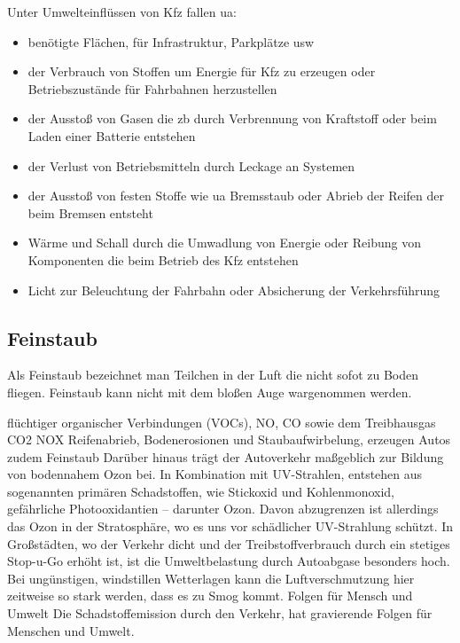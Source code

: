 Unter Umwelteinflüssen von \ac{Kfz} fallen \ac{ua}:
\begin{itemize}
	\item benötigte Flächen, für Infrastruktur, Parkplätze \ac{usw}
	\item der Verbrauch von Stoffen um Energie für \ac{Kfz} zu erzeugen oder Betriebszustände für Fahrbahnen herzustellen
	\item der Ausstoß von Gasen die \ac{zb} durch Verbrennung von Kraftstoff oder beim Laden einer Batterie entstehen
	\item der Verlust von Betriebsmitteln durch Leckage an Systemen
	\item der Ausstoß von festen Stoffe wie \ac{ua} Bremsstaub oder Abrieb der Reifen der beim Bremsen entsteht
	\item Wärme und Schall durch die Umwadlung von Energie oder Reibung von Komponenten die beim Betrieb des \ac{Kfz} entstehen
	\item Licht zur Beleuchtung der Fahrbahn oder Absicherung der Verkehrsführung
\end{itemize}


\subsection{Feinstaub}

Als Feinstaub bezeichnet man Teilchen in der Luft die nicht sofot zu Boden fliegen.
\newline
Feinstaub kann nicht mit dem bloßen Auge wargenommen werden.

flüchtiger organischer Verbindungen (VOCs), \ac{NO}, \ac{CO} sowie dem Treibhausgas \ac{CO2} \ac{NOX}
Reifenabrieb, Bodenerosionen und Staubaufwirbelung, erzeugen Autos zudem Feinstaub
Darüber hinaus trägt der Autoverkehr maßgeblich zur Bildung von bodennahem Ozon bei. In Kombination mit UV-Strahlen, entstehen aus sogenannten primären Schadstoffen, wie Stickoxid und Kohlenmonoxid, gefährliche Photooxidantien – darunter Ozon. Davon abzugrenzen ist allerdings das Ozon in der Stratosphäre, wo es uns vor schädlicher UV-Strahlung schützt.
In Großstädten, wo der Verkehr dicht und der Treibstoffverbrauch durch ein stetiges Stop-u-Go erhöht ist, ist die Umweltbelastung durch Autoabgase besonders hoch. Bei ungünstigen, windstillen Wetterlagen kann die Luftverschmutzung hier zeitweise so stark werden, dass es zu Smog kommt.
Folgen für Mensch und Umwelt
Die Schadstoffemission durch den Verkehr, hat gravierende Folgen für Menschen und Umwelt.

